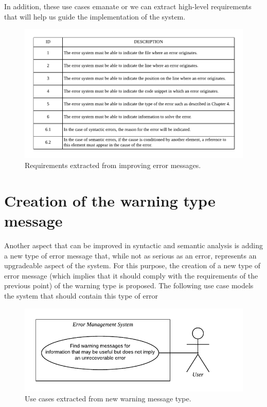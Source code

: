 In addition, these use cases emanate or we can extract high-level
requirements that will help us guide the implementation of the system.

\begin{figure}[h!]
    \includegraphics[width=\textwidth]{images/enh-err-requirements.pdf}
    \centering
    \caption[Requirements extracted from improving error messages]{Requirements extracted from improving error messages.}
    \label{fig:enh-err-req}
\end{figure}

\section{Creation of the warning type message}
Another aspect that can be improved in syntactic and semantic analysis
is adding a new type of error message that, while not as serious as an
error, represents an upgradeable aspect of the system. For this purpose,
the creation of a new type of error message (which implies that it
should comply with the requirements of the previous point) of the
warning type is proposed. The following use case models the system that
should contain this type of error

\begin{figure}[h!]
    \includegraphics[scale=0.8]{images/warn-use-case.pdf}
    \centering
    \caption[Use cases extracted from new warning message type]{Use cases extracted from new warning message type.}
    \label{fig:warn-use-case}
\end{figure}


